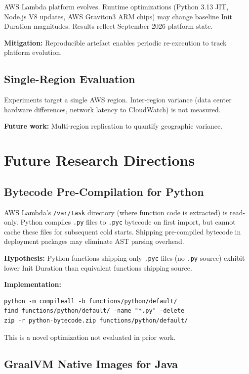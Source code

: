 AWS Lambda platform evolves. Runtime optimizations (Python 3.13 JIT, Node.js V8 updates, AWS Graviton3 ARM chips) may change baseline Init Duration magnitudes. Results reflect September 2026 platform state.

\textbf{Mitigation:} Reproducible artefact enables periodic re-execution to track platform evolution.

\subsection{Single-Region Evaluation}

Experiments target a single AWS region. Inter-region variance (data center hardware differences, network latency to CloudWatch) is not measured.

\textbf{Future work:} Multi-region replication to quantify geographic variance.

\section{Future Research Directions}

\subsection{Bytecode Pre-Compilation for Python}

AWS Lambda's \texttt{/var/task} directory (where function code is extracted) is read-only. Python compiles \texttt{.py} files to \texttt{.pyc} bytecode on first import, but cannot cache these files for subsequent cold starts. Shipping pre-compiled bytecode in deployment packages may eliminate AST parsing overhead.

\textbf{Hypothesis:} Python functions shipping only \texttt{.pyc} files (no \texttt{.py} source) exhibit lower Init Duration than equivalent functions shipping source.

\textbf{Implementation:}
\begin{verbatim}
python -m compileall -b functions/python/default/
find functions/python/default/ -name "*.py" -delete
zip -r python-bytecode.zip functions/python/default/
\end{verbatim}

This is a novel optimization not evaluated in prior work.

\subsection{GraalVM Native Images for Java}

